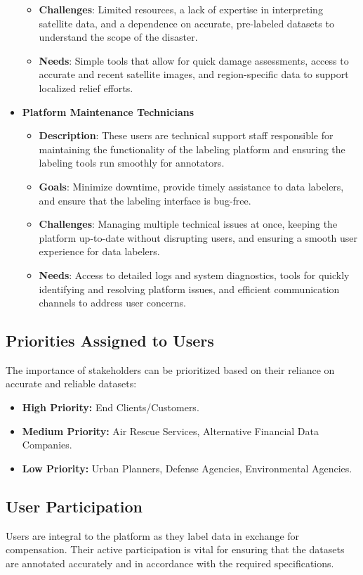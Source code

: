 \documentclass{article}
\begin{document}
\begin{itemize}
\begin{itemize}
        \item \textbf{Challenges}: Limited resources, a lack of expertise in interpreting satellite data, and a dependence on accurate, pre-labeled datasets to understand the scope of the disaster.
        \item \textbf{Needs}: Simple tools that allow for quick damage assessments, access to accurate and recent satellite images, and region-specific data to support localized relief efforts.
    \end{itemize}
    \item \textbf{Platform Maintenance Technicians}
    \begin{itemize}
        \item \textbf{Description}: These users are technical support staff responsible for maintaining the functionality of the labeling platform and ensuring the labeling tools run smoothly for annotators.
        \item \textbf{Goals}: Minimize downtime, provide timely assistance to data labelers, and ensure that the labeling interface is bug-free.
        \item \textbf{Challenges}: Managing multiple technical issues at once, keeping the platform up-to-date without disrupting users, and ensuring a smooth user experience for data labelers.
        \item \textbf{Needs}: Access to detailed logs and system diagnostics, tools for quickly identifying and resolving platform issues, and efficient communication channels to address user concerns.
    \end{itemize}
\end{itemize}

\subsection{Priorities Assigned to Users}
The importance of stakeholders can be prioritized based on their reliance on accurate and reliable datasets:
\begin{itemize}
    \item \textbf{High Priority:} End Clients/Customers.
    \item \textbf{Medium Priority:} Air Rescue Services, Alternative Financial Data Companies.
    \item \textbf{Low Priority:} Urban Planners, Defense Agencies, Environmental Agencies.
\end{itemize}

\subsection{User Participation}
Users are integral to the platform as they label data in exchange for compensation. Their active participation is vital for ensuring that the datasets are annotated accurately and in accordance with the required specifications.
\end{document}
